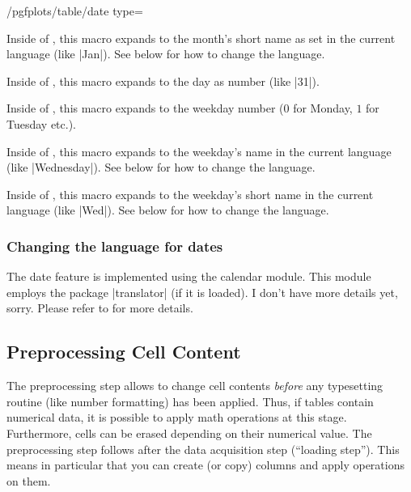 \begin{stylekey}{/pgfplots/table/date type=}
    \begin{command}{\monthshortname}
        Inside of , this macro expands to the month's short
        name as set in the current language (like |Jan|). See below for how to
        change the language.
    \end{command}

    \begin{command}{\day}
        Inside of , this macro expands to the day as number
        (like |31|).
    \end{command}

    \begin{command}{\weekday}
        Inside of , this macro expands to the weekday number
        ($0$ for Monday, $1$ for Tuesday etc.).
    \end{command}

    \begin{command}{\weekdayname}
        Inside of , this macro expands to the weekday's name
        in the current language (like |Wednesday|). See below for how to change
        the language.
    \end{command}

    \begin{command}{\weekdayshortname}
        Inside of , this macro expands to the weekday's short
        name in the current language (like |Wed|). See below for how to change
        the language.
    \end{command}


    \subsubsection*{Changing the language for dates}

    The date feature is implemented using the \PGF{} calendar module. This
    module employs the package |translator| (if it is loaded). I don't have
    more details yet, sorry. Please refer to \cite{tikz} for more details.
\end{stylekey}


\subsection{Preprocessing Cell Content}
\label{sec:pgfplotstable:preproc}

The preprocessing step allows to change cell contents \emph{before} any
typesetting routine (like number formatting) has been applied. Thus, if tables
contain numerical data, it is possible to apply math operations at this stage.
Furthermore, cells can be erased depending on their numerical value. The
preprocessing step follows after the data acquisition step (``loading step'').
This means in particular that you can create (or copy) columns and apply
operations on them.


